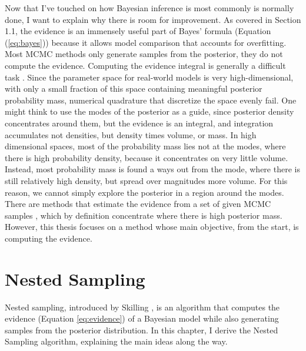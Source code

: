 \documentclass[12pt, a4paper]{report}
\begin{document}
Now that I've touched on how Bayesian inference is most commonly is normally done, I want to explain why there is room for improvement.
As covered in Section 1.1, the evidence is an immensely useful part of Bayes' formula (Equation (\ref{eq:bayes})) because it allows model comparison that accounts for overfitting.
Most MCMC methods only generate samples from the posterior, they do not compute the evidence.
Computing the evidence integral is generally a difficult task \cite[221]{mcelreath}.
Since the parameter space for real-world models is very high-dimensional, with only a small fraction of this space containing meaningful posterior probability mass, numerical quadrature that discretize the space evenly fail.
One might think to use the modes of the posterior as a guide, since posterior density concentrates around them, but the evidence is an integral, and integration accumulates not densities, but density times volume, or mass.
In high dimensional spaces, most of the probability mass lies not at the modes, where there is high probability density, because it concentrates on very little volume.
Instead, most probability mass is found a ways out from the mode, where there is still relatively high density, but spread over magnitudes more volume.
For this reason, we cannot simply explore the posterior in a region around the modes.
There are methods that estimate the evidence from a set of given MCMC samples \cite{bayesian_cubature}, which by definition concentrate where there is high posterior mass.
However, this thesis focuses on a method whose main objective, from the start, is computing the evidence.


\section{Nested Sampling}
Nested sampling, introduced by Skilling \cite{skilling}, is an algorithm that computes the evidence (Equation \ref{eq:evidence}) of a Bayesian model while also generating samples from the posterior distribution.
In this chapter, I derive the Nested Sampling algorithm, explaining the main ideas along the way.

\FloatBarrier
\end{document}
